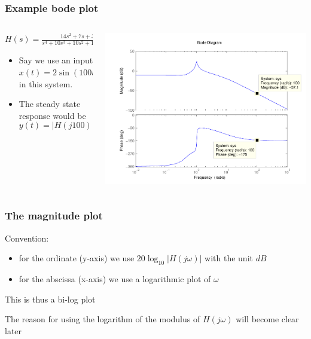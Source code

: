 \begin{frame}
\frametitle{Example bode plot}

	\begin{columns}
		\begin{column}{0.5\textwidth}
			$H(s) = \frac{14s^2 + 7s + 3}{s^4 + 10s^3 + 10s^2 + 10s + 10}$\\
			\vspace{10mm}
			\begin{itemize}
				\item Say we use an input $x(t) = 2\sin(100t)$ in this system.
				\item The steady state response would be 
				\vspace{5mm} $$y(t) = |H(j100)|\cdot 2\sin\Big(100t + \angle H(j100)\Big)$$
			\end{itemize}
		\end{column}
		
		\begin{column}{0.5\textwidth}
			\includegraphics[scale=0.4]{ExampleBode1}
		\end{column}
		
	\end{columns}



\end{frame}



\begin{frame}
\frametitle{The magnitude plot}

Convention: 
\begin{itemize}
\item for the ordinate (y-axis) we use $20\log_{10}|H(j\omega)|$ with the unit $dB$
\item for the abscissa (x-axis) we use a logarithmic plot of $\omega$

\end{itemize}
This is thus a bi-log plot

The reason for using the logarithm of the modulus of $H(j\omega)$ will become clear later

\end{frame}




